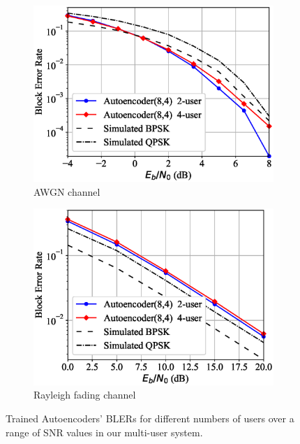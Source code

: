 \begin{figure}[!tp]
	\center
	\begin{subfigure}{0.45\textwidth}
		\includegraphics[width=\linewidth]{figs/multi_autoencoder_bler_awgn}
		\caption{AWGN channel}
	\end{subfigure}
	\begin{subfigure}{0.45\textwidth}
		\includegraphics[width=\linewidth]{figs/multi_autoencoder_bler_rayleigh}
		\caption{Rayleigh fading channel}	
	\end{subfigure}
	\caption{Trained Autoencoders' BLERs for different numbers of users over a range of SNR values in our multi-user system.}
	\label{fig:multi_autoencoder_bler}
\end{figure}


